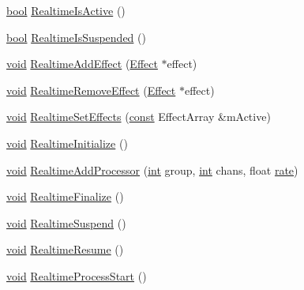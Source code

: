 \begin{DoxyCompactItemize}
\item 
\hyperlink{mac_2config_2i386_2lib-src_2libsoxr_2soxr-config_8h_abb452686968e48b67397da5f97445f5b}{bool} \hyperlink{class_effect_manager_a76c461f437c480f9c16595831e5945cd}{Realtime\+Is\+Active} ()
\item 
\hyperlink{mac_2config_2i386_2lib-src_2libsoxr_2soxr-config_8h_abb452686968e48b67397da5f97445f5b}{bool} \hyperlink{class_effect_manager_ab87a420bb23b929bddc69d756df6c5a9}{Realtime\+Is\+Suspended} ()
\item 
\hyperlink{sound_8c_ae35f5844602719cf66324f4de2a658b3}{void} \hyperlink{class_effect_manager_adefa768faccde2a7c9bc7ecd1c481671}{Realtime\+Add\+Effect} (\hyperlink{class_effect}{Effect} $\ast$effect)
\item 
\hyperlink{sound_8c_ae35f5844602719cf66324f4de2a658b3}{void} \hyperlink{class_effect_manager_aca31d14e3bcd1caba1b9b34b9c002029}{Realtime\+Remove\+Effect} (\hyperlink{class_effect}{Effect} $\ast$effect)
\item 
\hyperlink{sound_8c_ae35f5844602719cf66324f4de2a658b3}{void} \hyperlink{class_effect_manager_a8fe4b78c9c54d66d452c8addc0e1fbd0}{Realtime\+Set\+Effects} (\hyperlink{getopt1_8c_a2c212835823e3c54a8ab6d95c652660e}{const} Effect\+Array \&m\+Active)
\item 
\hyperlink{sound_8c_ae35f5844602719cf66324f4de2a658b3}{void} \hyperlink{class_effect_manager_a1a587e24ea7a3e80c573caa023e3e68f}{Realtime\+Initialize} ()
\item 
\hyperlink{sound_8c_ae35f5844602719cf66324f4de2a658b3}{void} \hyperlink{class_effect_manager_a949181b513b40ed61b5f20229fb94a21}{Realtime\+Add\+Processor} (\hyperlink{xmltok_8h_a5a0d4a5641ce434f1d23533f2b2e6653}{int} group, \hyperlink{xmltok_8h_a5a0d4a5641ce434f1d23533f2b2e6653}{int} chans, float \hyperlink{seqread_8c_ad89d3fac2deab7a9cf6cfc8d15341b85}{rate})
\item 
\hyperlink{sound_8c_ae35f5844602719cf66324f4de2a658b3}{void} \hyperlink{class_effect_manager_aca93aa3f54b1b6172ce5a7f511422f80}{Realtime\+Finalize} ()
\item 
\hyperlink{sound_8c_ae35f5844602719cf66324f4de2a658b3}{void} \hyperlink{class_effect_manager_a64c368e13a3e0ce60cb50e9a8a631e44}{Realtime\+Suspend} ()
\item 
\hyperlink{sound_8c_ae35f5844602719cf66324f4de2a658b3}{void} \hyperlink{class_effect_manager_a7f868e41b8a53fe8327de3e68fe7d15a}{Realtime\+Resume} ()
\item 
\hyperlink{sound_8c_ae35f5844602719cf66324f4de2a658b3}{void} \hyperlink{class_effect_manager_a6a9985dbb0d57fa33678cc8fa6f1e816}{Realtime\+Process\+Start} ()

\end{DoxyCompactItemize}
